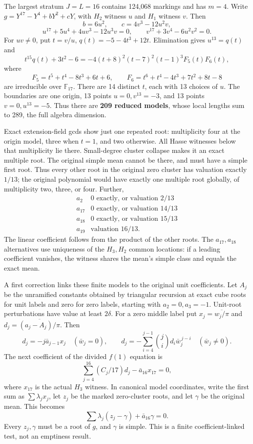 \documentclass[
  british,
  10pt,
]{article}
\begin{document}
The largest stratum \(J=L=16\) contains 124,068 markings and has
\(m=4\). Write \(g=Y^{17}-Y^4+bY^2+cY\), with \(H_2\) witness \(u\) and
\(H_1\) witness \(v\). Then \[
 b=6u^2,\qquad c=4v^3-12u^2v,
\] \[
 u^{17}+5u^4+4uv^3-12u^3v=0,\qquad
 v^{17}+3v^4-6u^2v^2=0.                                  \tag{D11}
\] For \(uv\ne0\), put \(t=v/u\), \(q(t)=-5-4t^3+12t\). Elimination
gives \(u^{13}=q(t)\) and \[
 t^{15}q(t)+3t^2-6=-4(t+8)^2(t-7)^2(t-1)^3F_5(t)F_6(t),
\] where \[
 F_5=t^5+t^4-8t^3+6t+6,\qquad
 F_6=t^6+t^4-4t^3+7t^2+8t-8
\] are irreducible over \(\mathbb F_{17}\). There are 14 distinct \(t\),
each with 13 choices of \(u\). The boundaries are one origin, 13 points
\(u=0,v^{13}=-3\), and 13 points \(v=0,u^{13}=-5\). Thus there are
\textbf{209 reduced models}, whose local lengths sum to 289, the full
algebra dimension.

Exact extension-field gcds show just one repeated root: multiplicity
four at the origin model, three when \(t=1\), and two otherwise. All
Hasse witnesses below that multiplicity lie there. Small-degree cluster
collapse makes it an exact multiple root. The original simple mean
cannot be there, and must have a simple first root. Thus every other
root in the original zero cluster has valuation exactly \(1/13\); the
original polynomial would have exactly one multiple root globally, of
multiplicity two, three, or four. Further, \[
\begin{array}{c|c}
a_2&0\text{ exactly, or valuation }2/13\\
a_{17}&0\text{ exactly, or valuation }14/13\\
a_{18}&0\text{ exactly, or valuation }15/13\\
a_{19}&\text{valuation }16/13.
\end{array}                                                    \tag{D12}
\] The linear coefficient follows from the product of the other roots.
The \(a_{17},a_{18}\) alternatives use uniqueness of the \(H_3,H_2\)
common locations: if a leading coefficient vanishes, the witness shares
the mean's simple class and equals the exact mean.

A first correction links these finite models to the original unit
coefficients. Let \(A_j\) be the unramified constants obtained by
triangular recursion at exact cube roots for unit labels and zero for
zero labels, starting with \(a_2=0,a_3=-1\). Unit-root perturbations
have value at least \(2\delta\). For a zero middle label put
\(x_j=\overline{w_j/\pi}\) and \(d_j=\overline{(a_j-A_j)/\pi}\). Then \[
 d_j=-j\bar a_{j-1}x_j\quad(\bar w_j=0),\qquad
 d_j=-\sum_{i=4}^{j-1}\binom ji d_i\bar w_j^{\,j-i}
       \quad(\bar w_j\ne0).
\] The next coefficient of the divided \(f(1)\) equation is \[
 \sum_{j=4}^{16}(C_j/17)d_j-\bar a_{16}x_{17}=0,
\] where \(x_{17}\) is the actual \(H_3\) witness. In canonical model
coordinates, write the first sum as \(\sum\lambda_jx_j\), let \(z_j\) be
the marked zero-cluster roots, and let \(\gamma\) be the original mean.
This becomes \[
 \sum\lambda_j(z_j-\gamma)+\bar a_{16}\gamma=0.
\] Every \(z_j,\gamma\) must be a root of \(g\), and \(\gamma\) is
simple. This is a finite coefficient-linked test, not an emptiness
result.
\end{document}
